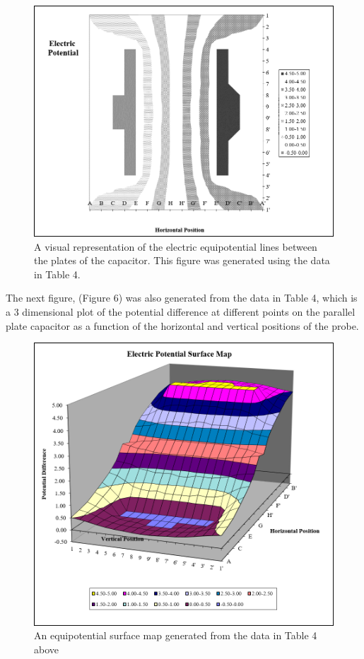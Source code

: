 \documentclass[letterpaper]{article}
\begin{document}
\begin{figure}[H]
  \centering
  \includegraphics[width=.9\textwidth]{chart2.png}
  \caption{A visual representation of the electric equipotential lines between the plates of the capacitor. This figure was generated using the data in Table 4.}
\end{figure}
\vspace{2cm}
The next figure, (Figure 6) was also generated from the data in Table 4, which is a 3
dimensional plot of the potential difference at different points on the parallel plate capacitor
as a function of the horizontal and vertical positions of the probe.
\begin{figure}[H]
  \centering
  \includegraphics[width=\textwidth]{chart3.png}
  \caption{An equipotential surface map generated from the data in Table 4 above}
\end{figure}
\end{document}
